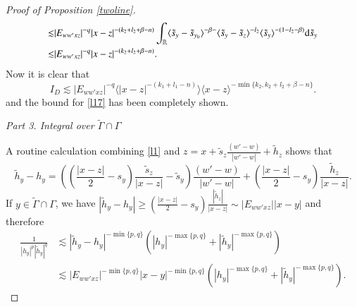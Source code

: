 \documentclass[11pt,reqno]{amsart}
\def\d{{\rm d}}
\numberwithin{equation}{section}
\theoremstyle{definition}
\begin{document}
\begin{appendix}
\begin{proof}[Proof of Proposition \ref{twoline}]
\begin{equation}
\begin{split}
				\lesssim&|E_{ww'xz}|^{-q}|x-z|^{-(k_2+l_2+\beta-n)}\int_{\mathbb{R}}\langle\tilde{s}_y-\tilde{s}_{y_0}\rangle^{-\beta-}\langle\tilde{s}_y-\tilde{s}_z\rangle^{-l_2}\langle\tilde{s}_y\rangle^{-(1-l_2-\beta)}\d\tilde{s}_y\\
				\lesssim&|E_{ww'xz}|^{-q}|x-z|^{-(k_2+l_2+\beta-n)}.
			\end{split}
		\end{equation}
		Now it is clear that
		\begin{equation*}\label{l29}
			I_D\lesssim|E_{ww'xz}|^{-q}\langle|x-z|^{-(k_1+l_1-n)}\rangle\langle x-z\rangle^{-\min\{k_2,k_2+l_2+\beta-n\}}.
		\end{equation*}
		and the bound for \eqref{l17} has been completely shown.
		
		\noindent\emph{Part 3. Integral over $\tilde{\Gamma}\cap\Gamma$}
		
		
		A routine calculation combining \eqref{l1} and $z=x+\tilde{s}_z\frac{(w'-w)}{|w'-w|}+\tilde{h}_z$ shows that
		\begin{equation*}
			\tilde{h}_y-h_y=\left(\left(\mbox{$\frac{|x-z|}{2}-s_y$}\right)\mbox{$\frac{\tilde{s}_z}{|x-z|}$}-\tilde{s}_y\right)\mbox{$\frac{(w'-w)}{|w'-w|}$}+\left(\mbox{$\frac{|x-z|}{2}-s_y$}\right)\mbox{$\frac{\tilde{h}_z}{|x-z|}$}.
		\end{equation*}
		If $y\in\tilde{\Gamma}\cap\Gamma$, we have $|\tilde{h}_y-h_y|\geq(\frac{|x-z|}{2}-s_y)\frac{|\tilde{h}_z|}{|x-z|}\sim|E_{ww'xz}||x-y|$
		and therefore
		\begin{equation}\label{l32}
			\begin{split}
				\frac{1}{|h_y|^p|\tilde{h}_y|^q}&\lesssim|\tilde{h}_y-h_y|^{-\min\{p,q\}}\left(|h_y|^{-\max\{p,q\}}+|\tilde{h}_y|^{-\max\{p,q\}}\right)\\
				&\lesssim|E_{ww'xz}|^{-\min\{p,q\}}|x-y|^{-\min\{p,q\}}\left(|h_y|^{-\max\{p,q\}}+|\tilde{h}_y|^{-\max\{p,q\}}\right).
			\end{split}
		\end{equation}
		

\end{proof}
\end{appendix}
\end{document}
